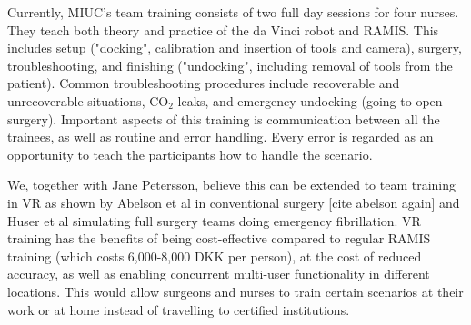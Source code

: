 \documentclass[conference]{IEEEtran}
\begin{document}
Currently, MIUC's team training consists of two full day sessions for four nurses. They teach both theory and practice of the da Vinci robot and RAMIS. This includes setup ("docking", calibration and insertion of tools and camera), surgery, troubleshooting, and finishing ("undocking", including removal of tools from the patient). Common troubleshooting procedures include recoverable and unrecoverable situations, CO$_2$ leaks, and emergency undocking (going to open surgery). Important aspects of this training is communication between all the trainees, as well as routine and error handling. Every error is regarded as an opportunity to teach the participants how to handle the scenario.

We, together with Jane Petersson, believe this can be extended to team training in VR as shown by Abelson et al in conventional surgery [cite abelson again] and Huser et al simulating full surgery teams doing emergency fibrillation. VR training has the benefits of being cost-effective compared to regular RAMIS training (which costs 6,000-8,000 DKK per person), at the cost of reduced accuracy, as well as enabling concurrent multi-user functionality in different locations. This would allow surgeons and nurses to train certain scenarios at their work or at home instead of travelling to certified institutions. 


%
%

\end{document}

